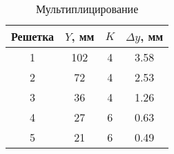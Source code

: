 \begin{table}[]
    \centering
    \begin{tabular}{|c|c|c|c|}
    \hline
    Решетка    & $Y$, мм & $K$ & $\Delta y$, мм \\ \hline
    1          & 102     & 4   & 3.58           \\ \hline
    2          & 72      & 4   & 2.53           \\ \hline
    3          & 36      & 4   & 1.26           \\ \hline
    4          & 27      & 6   & 0.63           \\ \hline
    5          & 21      & 6   & 0.49           \\ \hline
    \end{tabular}
    \caption{Мультиплицирование}
    \label{table:multiplication}
\end{table}